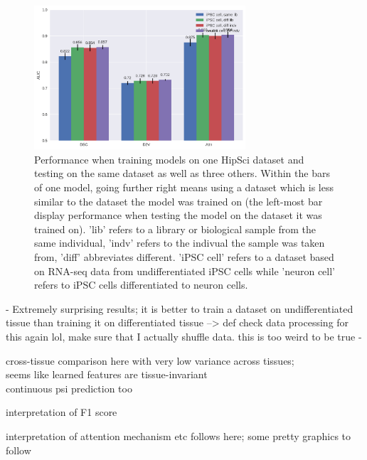 \begin{figure}
	\centering\includegraphics[width=0.7\textwidth]{../visualizations/ch5-results/majiq_comparison_barcharts.png} 
	\caption{Performance when training models on one HipSci dataset and testing on the same dataset as well as three others. Within the bars of one model, going further right means using a dataset which is less similar to the dataset the model was trained on (the left-most bar display performance when testing the model on the dataset it was trained on). 'lib' refers to a library or biological sample from the same individual, 'indv' refers to the indivual the sample was taken from, 'diff' abbreviates different. 'iPSC cell' refers to a dataset based on RNA-seq data from undifferentiated iPSC cells while 'neuron cell' refers to iPSC cells differentiated to neuron cells. }
	\label{fig:majiq_comparison_barcharts}
\end{figure}

- Extremely surprising results; it is better to train a dataset on undifferentiated tissue than training it on differentiated tissue --> def check data processing for this again lol, make sure that I actually shuffle data. this is too weird to be true
- 

cross-tissue comparison here with very low variance across tissues;\\
seems like learned features are tissue-invariant\\

continuous psi prediction too

interpretation of F1 score

interpretation of attention mechanism etc follows here; some pretty graphics to follow